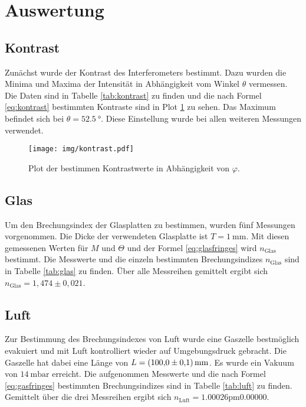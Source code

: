 \section{Auswertung}
\label{sec:Auswertung}


\subsection{Kontrast}

Zunächst wurde der Kontrast des Interferometers bestimmt. Dazu wurden die Minima und Maxima der Intensität in Abhängigkeit vom Winkel $\theta$ vermessen. Die Daten sind in Tabelle \ref{tab:kontrast} zu finden und die nach Formel \eqref{eq:kontrast} bestimmten Kontraste sind in Plot \ref{img:kontrast} zu sehen. Das  Maximum befindet sich bei $\theta = \SI{52.5}{°}$. Diese Einstellung wurde bei allen weiteren Messungen verwendet.

\begin{figure}
  \centering
  \texttt{[image: img/kontrast.pdf]}
  \caption{Plot der bestimmen Kontrastwerte in Abhängigkeit von $\varphi$.}
  \label{img:kontrast}
\end{figure}




\subsection{Glas}

Um den Brechungsindex der Glasplatten zu bestimmen, wurden fünf Messungen vorgenommen. Die Dicke der verwendeten Glasplatte ist $T=\SI{1}{\milli\meter}$.
Mit diesen gemessenen Werten für $M$ und $\Theta$ und der Formel \eqref{eq:glasfringes} wird $n_\text{Glas}$ bestimmt. Die Messwerte und die einzeln bestimmten Brechungsindizes
 $n_\text{Glas}$ sind in Tabelle \ref{tab:glas} zu finden.
Über alle Messreihen gemittelt ergibt sich $n_\text{Glas}={1,474\pm 0,021}$.




\subsection{Luft}

Zur Bestimmung des Brechungsindexes von Luft wurde eine Gaszelle bestmöglich evakuiert und mit Luft kontrolliert wieder auf Umgebungsdruck gebracht. Die Gaszelle hat dabei eine Länge von $L=\SI{100\pm 0.1}{\milli \meter}$. Es wurde ein
Vakuum von $\SI{14}{\milli \bar}$ erreicht. Die aufgenommen Messwerte und die nach Formel \eqref{eq:gasfringes} bestimmten Brechungsindizes sind in Tabelle \ref{tab:luft} zu finden.
Gemittelt über die drei Messreihen ergibt sich $n_\text{Luft}=\si{1.00026 \pm 0.00000}$.

